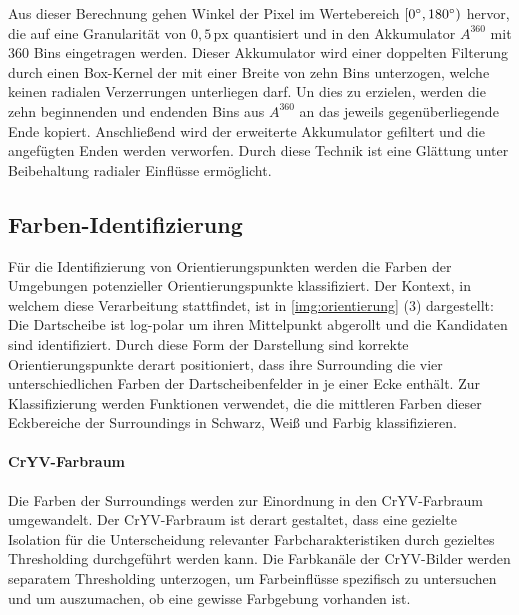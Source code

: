 Aus dieser Berechnung gehen Winkel der Pixel im Wertebereich $[0^{\circ}, 180^{\circ})$ hervor, die auf eine Granularität von $0,\!5\,\text{px}$ quantisiert und in den Akkumulator $A^{360}$ mit $360$ Bins eingetragen werden. Dieser Akkumulator wird einer doppelten Filterung durch einen Box-Kernel der mit einer Breite von zehn Bins unterzogen, welche keinen radialen Verzerrungen unterliegen darf. Un dies zu erzielen, werden die zehn beginnenden und endenden Bins aus $A^{360}$ an das jeweils gegenüberliegende Ende kopiert. Anschließend wird der erweiterte Akkumulator gefiltert und die angefügten Enden werden verworfen. Durch diese Technik ist eine Glättung unter Beibehaltung radialer Einflüsse ermöglicht.



\vspace*{-0.1cm}
\subsection{Farben-Identifizierung}
\label{sec:farbidentifizierung_impl}

Für die Identifizierung von Orientierungspunkten werden die Farben der Umgebungen potenzieller Orientierungspunkte klassifiziert. Der Kontext, in welchem diese Verarbeitung stattfindet, ist in \autoref{img:orientierung} (3) dargestellt: Die Dartscheibe ist log-polar um ihren Mittelpunkt abgerollt und die Kandidaten sind identifiziert. Durch diese Form der Darstellung sind korrekte Orientierungspunkte derart positioniert, dass ihre Surrounding die vier unterschiedlichen Farben der Dartscheibenfelder in je einer Ecke enthält. Zur Klassifizierung werden Funktionen verwendet, die die mittleren Farben dieser Eckbereiche der Surroundings in Schwarz, Weiß und Farbig klassifizieren.

\vspace*{-0.1cm}
\paragraph{CrYV-Farbraum}

Die Farben der Surroundings werden zur Einordnung in den CrYV-Farbraum umgewandelt. Der CrYV-Farbraum ist derart gestaltet, dass eine gezielte Isolation für die Unterscheidung relevanter Farbcharakteristiken durch gezieltes Thresholding durchgeführt werden kann. Die Farbkanäle der CrYV-Bilder werden separatem Thresholding unterzogen, um Farbeinflüsse spezifisch zu untersuchen und um auszumachen, ob eine gewisse Farbgebung vorhanden ist.


